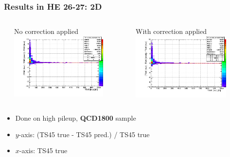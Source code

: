 \documentclass[bigger]{beamer}
\providecommand{\alert}[1]{\textbf{#1}}
\begin{document}
\begin{frame}
\frametitle{Results in HE 26-27: 2D}
\label{sec-3-3-18}
\begin{columns} %
\label{sec-3-3-18-1}
\begin{column}{0.55\textwidth}
\label{sec-3-3-18-1-1}

\centering
No correction applied
\includegraphics[width=0.8\textwidth]{fig/delta_uncorrected_QCD1800_ring_4.png}
\end{column}
\begin{column}{0.55\textwidth}
\label{sec-3-3-18-1-2}

\centering
With correction applied
\includegraphics[width=0.8\textwidth]{fig/delta_corrected_QCD1800_ring_4.png}
\end{column}
\end{columns}
\label{sec-3-3-18-2}
\begin{itemize}

\item Done on high pileup, \alert{QCD1800} sample
\label{sec-3-3-18-2-1}%

\item $y$-axis: (TS45 true - TS45 pred.) / TS45 true
\label{sec-3-3-18-2-2}%

\item $x$-axis: TS45 true
\label{sec-3-3-18-2-3}%

\end{itemize} %
\end{frame}
\end{document}
